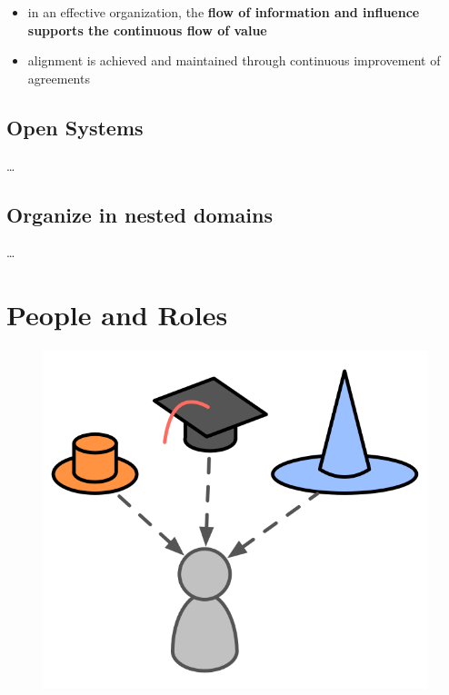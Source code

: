 \begin{itemize}
\item in an effective organization, the \textbf{flow of information and influence supports the continuous flow of value}

\item alignment is achieved and maintained through continuous improvement of agreements

\end{itemize}

\section{Open Systems}
\label{opensystems}

{\ldots}

\section{Organize in nested domains}
\label{organizeinnesteddomains}

{\ldots}

\chapter{People and Roles}
\label{peopleandroles}

\begin{figure}[htbp]
\centering
\includegraphics[keepaspectratio,width=\textwidth,height=0.75\textheight]{img/people-and-roles/roles.png}
\end{figure}


